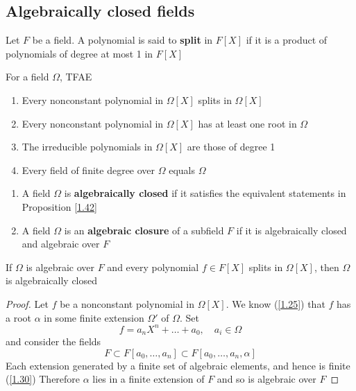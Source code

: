 \documentclass[11pt]{article}
\begin{document}
\subsection{Algebraically closed fields}
\label{sec:org080c9ce}
Let \(F\) be a field. A polynomial is said to \textbf{split} in \(F[X]\) if it is a product of
polynomials of degree at most 1 in \(F[X]\)

\begin{proposition}[]
\label{1.42}
For a field \(\Omega\), TFAE
\begin{enumerate}
\item Every nonconstant polynomial in \(\Omega[X]\) splits in \(\Omega[X]\)
\item Every nonconstant polynomial in \(\Omega[X]\) has at least one root in \(\Omega\)
\item The irreducible polynomials in \(\Omega[X]\) are those of degree 1
\item Every field of finite degree over \(\Omega\) equals \(\Omega\)
\end{enumerate}
\end{proposition}

\begin{definition}[]
\begin{enumerate}
\item A field \(\Omega\) is \textbf{algebraically closed} if it satisfies the equivalent statements in Proposition \ref{1.42}
\item A field \(\Omega\) is an \textbf{algebraic closure} of a subfield \(F\) if it is algebraically closed and
algebraic over \(F\)
\end{enumerate}
\end{definition}

\begin{proposition}[]
If \(\Omega\) is algebraic over \(F\) and every polynomial \(f\in F[X]\) splits in \(\Omega[X]\), then \(\Omega\) is
algebraically closed
\end{proposition}

\begin{proof}
Let \(f\) be a nonconstant polynomial in \(\Omega[X]\). We know (\ref{1.25}) that \(f\) has a root
\(\alpha\) in some finite extension \(\Omega'\) of \(\Omega\). Set
\begin{equation*}
f=a_nX^n+\dots+a_0,\quad a_i\in\Omega
\end{equation*}
and consider the fields
\begin{equation*}
F\subset F[a_0,\dots,a_n]\subset F[a_0,\dots,a_n,\alpha]
\end{equation*}
Each extension generated by a finite set of algebraic elements, and hence is finite (\ref{1.30})
Therefore \(\alpha\) lies in a finite extension of \(F\) and so is algebraic over \(F\)
\end{proof}
\end{document}
